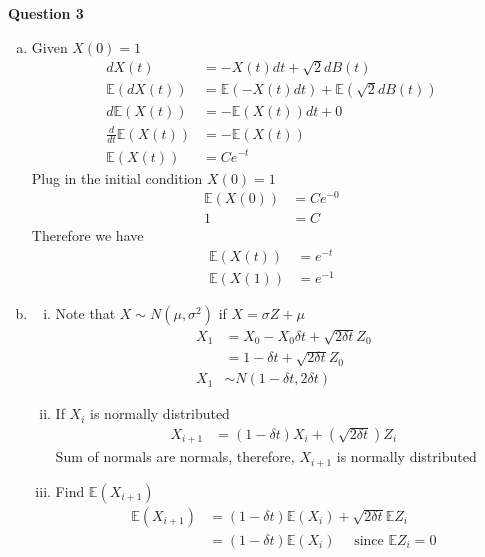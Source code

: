 \documentclass[12pt, letterpaper]{article}
\begin{document}
\newpage
\noindent \textbf{Question 3} 
\begin{enumerate}[a.]
    \item Given $X(0) = 1$
    \begin{align*}
        dX(t) &= -X(t)dt + \sqrt2 dB(t) \\
        \mathbb{E}(dX(t)) &= \mathbb{E}(-X(t)dt) + \mathbb{E}(\sqrt2 dB(t)) \\
        d\mathbb{E}(X(t)) &= -\mathbb{E}(X(t))dt + 0 \\ 
        \frac{d}{dt}\mathbb{E}(X(t)) &= - \mathbb{E}(X(t)) \\
        \mathbb{E}(X(t)) &= Ce^{-t}
    \end{align*}
    Plug in the initial condition $X(0) = 1$
    \begin{align*}
        \mathbb{E}(X(0)) &= Ce^{-0} \\
        1 &= C
    \end{align*} 
    Therefore we have 
    \begin{align*}
        \mathbb{E}(X(t)) &= e^{-t} \\
        \mathbb{E}(X(1)) &= e^{-1}
    \end{align*}
    \item \begin{enumerate}[i.]
        \item Note that $X \sim N(\mu, \sigma^2)$ if $X = \sigma Z + \mu$
        \begin{align*}
            X_1 &= X_0 - X_0\delta t + \sqrt{2\delta t} Z_0 \\
            &= 1 - \delta t + \sqrt{2\delta t} Z_0 \\
            X_1 &\sim N(1-\delta t,2\delta t)
        \end{align*}
        \item If $X_i$ is normally distributed
        \begin{align*}
            X_{i+1} &= (1-\delta t)X_i + (\sqrt{2\delta t}) Z_i
        \end{align*}
        Sum of normals are normals, therefore, $X_{i+1}$ is normally distributed
        \item Find $\mathbb{E}(X_{i+1})$
        \begin{align*}
            \mathbb{E}(X_{i+1}) &= (1-\delta t)\mathbb{E}(X_i) + \sqrt{2\delta t} \mathbb{E} Z_i \\
            &= (1-\delta t)\mathbb{E}(X_i)\quad \text{ since } \mathbb{E}Z_i = 0
        \end{align*}

\end{enumerate}
\end{enumerate}
\end{document}
